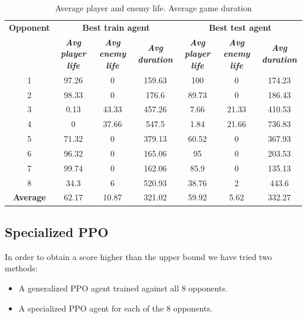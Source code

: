 \documentclass[conference]{IEEEtran}
\begin{document}
    \begin{table}[htbp]
        \caption{Average player and enemy life. Average game duration}
        \begin{center}
            \begin{tabular}{|c|c|c|c|c|c|c|}
                \hline
                \textbf{Opponent}&\multicolumn{3}{|c|}{\textbf{Best train agent}}&\multicolumn{3}{|c|}{\textbf{Best test agent}} \\
                \cline{2-7}
                & \textbf{\textit{Avg player life}}& \textbf{\textit{Avg enemy life}}& \textbf{\textit{Avg duration}} & \textbf{\textit{Avg player life}}& \textbf{\textit{Avg enemy life}}& \textbf{\textit{Avg duration}} \\
                \hline
                1 & 97.26 &     0 &  159.63 &    100 &     0 &  174.23 \\
                2 & 98.33 &     0 &   176.6 &  89.73 &     0 &  186.43 \\
                3 &  0.13 & 43.33 &  457.26 &   7.66 & 21.33 &  410.53 \\
                4 &     0 & 37.66 &   547.5 &   1.84 & 21.66 &  736.83 \\
                5 & 71.32 &     0 &  379.13 &  60.52 &     0 &  367.93 \\
                6 & 96.32 &     0 &  165.06 &     95 &     0 &  203.53 \\
                7 & 99.74 &     0 &  162.06 &   85.9 &     0 &  135.13 \\
                8 &  34.3 &     6 &  520.93 &  38.76 &     2 &   443.6 \\
                \hline
                \textbf{Average} & 62.17 & 10.87 & 321.02 & 59.92 & 5.62 & 332.27 \\
            \end{tabular}
        \end{center}
    \end{table}

    \subsection{Specialized PPO}\label{subsec:specialized-ppo}
    In order to obtain a score higher than the upper bound we have tried two methods:
    \begin{itemize}
        \item A generalized PPO agent trained against all $8$ opponents.
        \item A specialized PPO agent for each of the $8$ opponents.
    \end{itemize}
\end{document}
